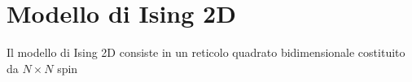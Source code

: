 \section{Modello di Ising 2D}

Il modello di Ising 2D consiste in un reticolo quadrato bidimensionale costituito da $N \times N$ spin 


